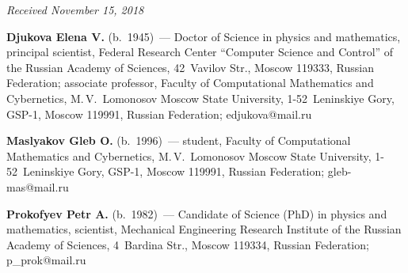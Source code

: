 \hfill{\small\textit{Received November 15, 2018}}


    
    \Contr
    
    \noindent
    \textbf{Djukova Elena V.} (b.\ 1945)~--- Doctor of Science in physics and 
mathematics, principal scientist, Federal Research Center ``Computer Science and 
Control'' of the Russian Academy of Sciences, 42~Vavilov Str., Moscow 119333, 
Russian Federation; associate professor, Faculty of Computational Mathematics and 
Cybernetics, M.\,V.~Lomonosov Moscow State University, 1-52~Leninskiye Gory, 
GSP-1, Moscow 119991, Russian Federation; \mbox{edjukova@mail.ru} 
    \vspace*{3pt}
    
    \noindent
    \textbf{Maslyakov Gleb O.} (b.\ 1996)~--- student, Faculty of Computational 
Mathematics and Cybernetics, M.\,V.~Lomonosov Moscow State University,  
1-52~Leninskiye Gory, GSP-1, Moscow 119991, Russian Federation;  
\mbox{gleb-mas@mail.ru} 
    
    \vspace*{3pt}
    
    \noindent
    \textbf{Prokofyev Petr A.} (b.\ 1982)~--- Candidate of Science (PhD) in 
physics and mathematics, scientist, Mechanical Engineering Research Institute of the 
Russian Academy of Sciences, 4~Bardina Str., Moscow 119334, Russian 
Federation; \mbox{p\_prok@mail.ru}
    


\label{end\stat}

\renewcommand{\bibname}{\protect\rm Литература}       